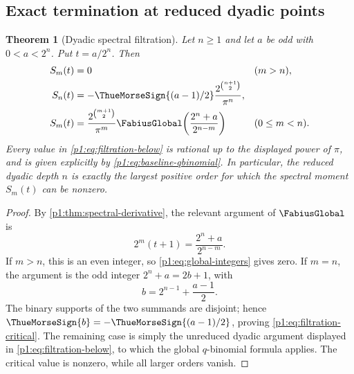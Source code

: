 \documentclass[11pt,oneside]{article}
\newtheorem{theorem}{Theorem}[section]
\theoremstyle{definition}
\theoremstyle{remark}
\begin{document}
\subsection{Exact termination at reduced dyadic points}

\begin{theorem}[Dyadic spectral filtration]\label{p1:thm:dyadic-filtration}
Let $n\ge1$ and let $a$ be odd with $0<a<2^n$.  Put $t=a/2^n$.  Then
\begin{align}
 S_m(t)&=0 &&(m>n),
 \label{p1:eq:filtration-above}\\
 S_n(t)&=-\ThueMorseSign{(a-1)/2}
 \frac{2^{\binom{n+1}{2}}}{\pi^n},
 \label{p1:eq:filtration-critical}\\
 S_m(t)&=\frac{2^{\binom{m+1}{2}}}{\pi^m}
 \FabiusGlobal\!\left(\frac{2^n+a}{2^{n-m}}\right)
 &&(0\le m<n).
 \label{p1:eq:filtration-below}
\end{align}
Every value in \eqref{p1:eq:filtration-below} is rational up to the displayed
power of $\pi$, and is given explicitly by \eqref{p1:eq:baseline-qbinomial}.
In particular, the reduced dyadic depth $n$ is exactly the largest positive
order for which the spectral moment $S_m(t)$ can be nonzero.
\end{theorem}

\begin{proof}
By \cref{p1:thm:spectral-derivative}, the relevant argument of $\FabiusGlobal$ is
\[
 2^m(t+1)=\frac{2^n+a}{2^{n-m}}.
\]
If $m>n$, this is an even integer, so \eqref{p1:eq:global-integers} gives zero.
If $m=n$, the argument is the odd integer $2^n+a=2b+1$, with
\[
 b=2^{n-1}+\frac{a-1}{2}.
\]
The binary supports of the two summands are disjoint; hence
$\ThueMorseSign{b}=-\ThueMorseSign{(a-1)/2}$, proving \eqref{p1:eq:filtration-critical}.  The remaining
case is simply the unreduced dyadic argument displayed in
\eqref{p1:eq:filtration-below}, to which the global $q$-binomial formula applies.
The critical value is nonzero, while all larger orders vanish.
\end{proof}
\end{document}
